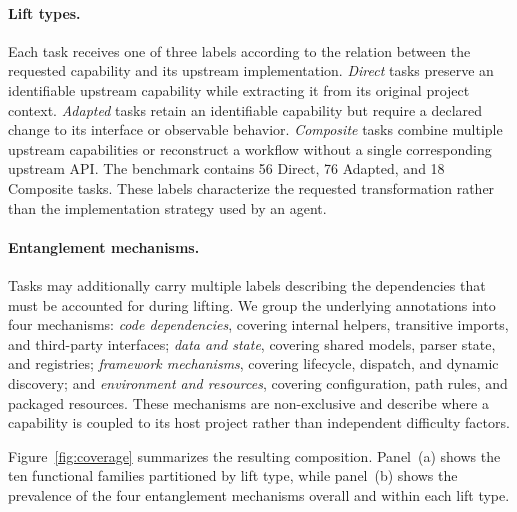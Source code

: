 \documentclass[acmsmall,screen,review,anonymous]{acmart}
\begin{document}
\paragraph{Lift types.}
Each task receives one of three labels according to the relation between the
requested capability and its upstream implementation. \emph{Direct} tasks
preserve an identifiable upstream capability while extracting it from its
original project context. \emph{Adapted} tasks retain an identifiable capability
but require a declared change to its interface or observable behavior.
\emph{Composite} tasks combine multiple upstream capabilities or reconstruct a
workflow without a single corresponding upstream API. The benchmark contains 56
Direct, 76 Adapted, and 18 Composite tasks. These labels characterize the
requested transformation rather than the implementation strategy used by an
agent.

\paragraph{Entanglement mechanisms.}
Tasks may additionally carry multiple labels describing the dependencies that
must be accounted for during lifting. We group the underlying annotations into
four mechanisms: \emph{code dependencies}, covering internal helpers, transitive
imports, and third-party interfaces; \emph{data and state}, covering shared
models, parser state, and registries; \emph{framework mechanisms}, covering
lifecycle, dispatch, and dynamic discovery; and \emph{environment and
resources}, covering configuration, path rules, and packaged resources. These
mechanisms are non-exclusive and describe where a capability is coupled to its
host project rather than independent difficulty factors.

Figure~\ref{fig:coverage} summarizes the resulting composition. Panel~(a) shows
the ten functional families partitioned by lift type, while panel~(b) shows the
prevalence of the four entanglement mechanisms overall and within each lift
type.
\end{document}
